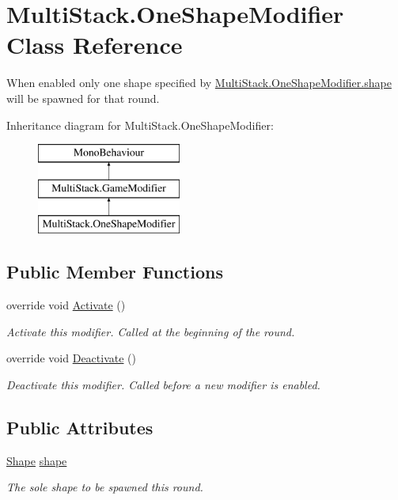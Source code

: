 \hypertarget{class_multi_stack_1_1_one_shape_modifier}{}\section{Multi\+Stack.\+One\+Shape\+Modifier Class Reference}
\label{class_multi_stack_1_1_one_shape_modifier}


When enabled only one shape specified by \hyperlink{class_multi_stack_1_1_one_shape_modifier_a5724e9f0dc3edb5f97363252a67b5db5}{Multi\+Stack.\+One\+Shape\+Modifier.\+shape} will be spawned for that round.  


Inheritance diagram for Multi\+Stack.\+One\+Shape\+Modifier\+:\begin{figure}[H]
\begin{center}
\leavevmode
\includegraphics[height=3.000000cm]{class_multi_stack_1_1_one_shape_modifier}
\end{center}
\end{figure}
\subsection*{Public Member Functions}
\begin{DoxyCompactItemize}
\item 
override void \hyperlink{class_multi_stack_1_1_one_shape_modifier_a36e475d44744e4f6d5b3dbe1b1ee3a16}{Activate} ()
\begin{DoxyCompactList}\small\item\em Activate this modifier. Called at the beginning of the round. \end{DoxyCompactList}\item 
override void \hyperlink{class_multi_stack_1_1_one_shape_modifier_a26f5a41e291d04df9a55fd931ff834ec}{Deactivate} ()
\begin{DoxyCompactList}\small\item\em Deactivate this modifier. Called before a new modifier is enabled. \end{DoxyCompactList}\end{DoxyCompactItemize}
\subsection*{Public Attributes}
\begin{DoxyCompactItemize}
\item 
\hyperlink{namespace_multi_stack_ac7f637887fea673ceeae6fdd0598c048}{Shape} \hyperlink{class_multi_stack_1_1_one_shape_modifier_a5724e9f0dc3edb5f97363252a67b5db5}{shape}
\begin{DoxyCompactList}\small\item\em The sole shape to be spawned this round. \end{DoxyCompactList}\end{DoxyCompactItemize}


